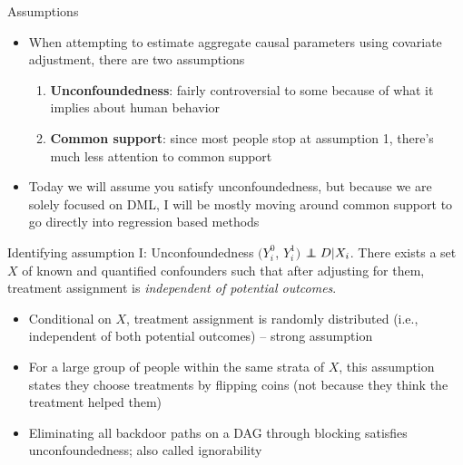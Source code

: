 \documentclass{beamer}
\newcommand\independent{\protect\mathpalette{\protect\independenT}{\perp}}
\def\independenT#1#2{\mathrel{\rlap{$#1#2$}\mkern2mu{#1#2}}}
\begin{document}
\begin{frame}{Assumptions}

\begin{itemize}

\item When attempting to estimate aggregate causal parameters using covariate adjustment, there are two assumptions

	\begin{enumerate}
	\item \textbf{Unconfoundedness}:  fairly controversial to some because of what it implies about human behavior
	\item \textbf{Common support}: since most people stop at assumption 1, there's much less attention to common support
	\end{enumerate}
\item Today we will assume you satisfy unconfoundedness, but because we are solely focused on DML, I will be mostly moving around common support to go directly into regression based methods
\end{itemize}

\end{frame}


\begin{frame}[plain]

	\begin{block}{Identifying assumption I: Unconfoundedness}
	$(Y_i^0$, $Y_i^1)$ $\independent{D} | X_i$. There exists a set $X$ of known and quantified confounders such that after adjusting for them, treatment assignment is \emph{independent of potential outcomes}.
	\end{block}
	
	\begin{itemize}
	\item Conditional on $X$, treatment assignment is randomly distributed (i.e., independent of both potential outcomes) -- strong assumption
	\item For a large group of people within the same strata of $X$, this assumption states they choose treatments by flipping coins (not because they think the treatment helped them)
	\item Eliminating all backdoor paths on a DAG through blocking satisfies unconfoundedness; also called ignorability
	\end{itemize}
\end{frame}
\end{document}
